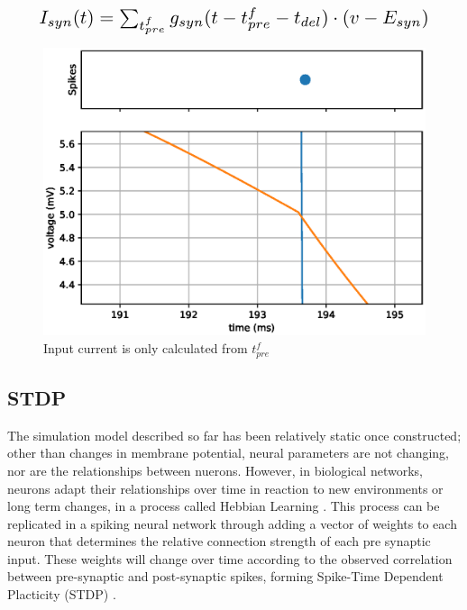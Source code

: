 \begin{equation}\label{eq:presynapticfix}
    \scalebox{1.5}{$
        I_{syn}(t) = \sum_{t^f_{pre}} g_{syn}(t-t^f_{pre}-t_{del})\cdot(v-E_{syn})
    $}\end{equation}
\vspace{1ex}

\begin{figure}[ht]
    \centering
    \includegraphics[width=0.5\linewidth]{figures/graphs/bugZoomed.eps}
    \caption{Input current is only calculated from $t^f_{pre}$}
    \label{fig:LIFDUALBUG}
\end{figure}




\subsection{STDP}

The simulation model described so far has been relatively static once
constructed; other than changes in membrane potential, neural parameters are not
changing, nor are the relationships between nuerons. However, in biological
networks, neurons adapt their relationships over time in reaction to new
environments or long term changes, in a process called Hebbian Learning
\autocite{trappenberg_fundamentals_2009}. This process can be replicated in a
spiking neural network through adding a vector of weights to each neuron that
determines the relative connection strength of each pre synaptic input. These
weights will change over time according to the observed correlation between
pre-synaptic and post-synaptic spikes, forming Spike-Time Dependent Placticity
(STDP) \autocite{iakymchuk_simplified_2015}.

